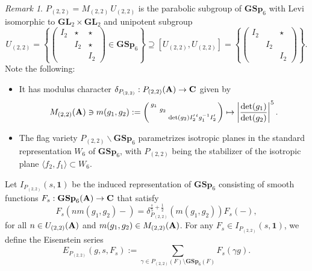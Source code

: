 \documentclass[11pt, reqno]{amsart}
\theoremstyle{plain}
\theoremstyle{definition}
\theoremstyle{remark}
\newtheorem{remark}[theorem]{Remark}
\theoremstyle{plain}
\def\C{{\bf C}}
\def\A{{\bf A}}
\def\GSp{{\mathbf{GSp}}}
\def\GL{\mathbf{GL}}
\begin{document}
\begin{remark}
 $P_{(2, 2)} = M_{(2, 2)}\, U_{(2, 2)}$ is the parabolic subgroup of $\GSp_6$ with Levi isomorphic to $\GL_2\times\GL_2$ and unipotent subgroup 
\[U_{(2, 2)} = \left\{ \left(\begin{smallmatrix} I_2 &  \star & \star \\ & I_2 & \star \\ & & I_2 \end{smallmatrix} \right)\in \GSp_6 \right\} \supseteq [U_{(2, 2)} , U_{(2, 2)} ] = \left\{ \left(\begin{smallmatrix} I_2 &  & \star \\ & I_2 & \\ & & I_2 \end{smallmatrix} \right)\right\}. \]
Note the following: \begin{itemize}
    \item It has modulus character $\delta_{P_{(2, 2)} } : P_{(2, 2)} (\A) \to \C$ given by \[ M_{(2, 2)}(\A) \ni  m(g_1,g_2) := \left(\begin{smallmatrix} g_1 &   &  \\ & g_2 &  \\ & & {\rm det}(g_2) I_2'{}^t g_1^{-1} I_2' \end{smallmatrix} \right) \mapsto \left| \frac{{\rm det}(g_1)}{{\rm det}(g_2)} \right|^5. \]
    \item The flag variety $P_{(2, 2)}  \backslash \GSp_6$ parametrizes isotropic planes in the standard representation $W_6$ of $\GSp_6$, with $P_{(2,2)}$ being the stabilizer of the isotropic plane $\langle f_2, f_1\rangle \subset W_6$. 
\end{itemize}
 
    
\end{remark}
 
 
Let $I_{P_{(2,2)}}(s, \mathbf{1})$ be the induced representation of $\GSp_{6}$ consisting of smooth functions $F_{s}:\GSp_{6}(\A)\to\C$ that satisfy
\begin{equation}\label{Induction:22}F_{s}(n m(g_1,g_2) -) =\delta_{P_{(2,2)}}^{\frac{s}{5} + \frac{1}{2} }(m(g_1,g_2))F_{s}(-),\end{equation}
for all $n \in U_{(2,2)}(\A)$ and $m(g_1,g_2) \in M_{{(2,2)}}(\A)$.  
 For any $F_s\in I_{P_{(2,2)}}(s, \mathbf{1})$, we define the Eisenstein series \[E_{P_{(2,2)}}(g,s,F_s) := \sum_{\gamma\in P_{(2,2)}(F)\setminus \GSp_6(F)}F_s(\gamma g).\] 
\end{document}
